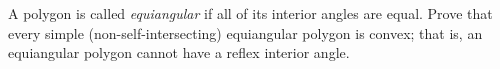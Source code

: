 A polygon is called \emph{equiangular} if all of its interior angles are equal. Prove that every simple (non-self-intersecting) equiangular polygon is convex; that is, an equiangular polygon cannot have a reflex interior angle.
